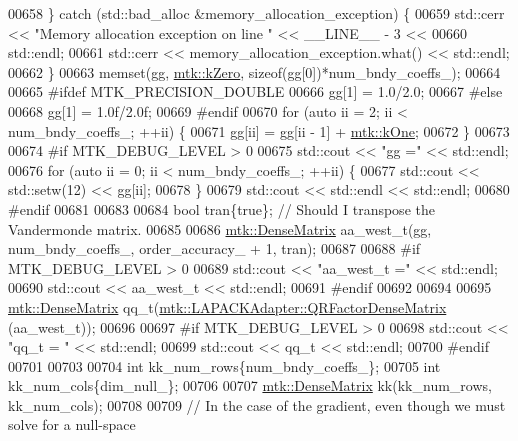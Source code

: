 \begin{DoxyCode}
{{00658   \} \textcolor{keywordflow}{catch} (std::bad\_alloc &memory\_allocation\_exception) \{
00659     std::cerr << \textcolor{stringliteral}{"Memory allocation exception on line "} << \_\_LINE\_\_ - 3 <<
00660       std::endl;
00661     std::cerr << memory\_allocation\_exception.what() << std::endl;
00662   \}
00663   memset(gg, \hyperlink{group__c01-roots_ga59a451a5fae30d59649bcda274fea271}{mtk::kZero}, \textcolor{keyword}{sizeof}(gg[0])*num\_bndy\_coeffs\_);
00664 
00665 \textcolor{preprocessor}{  #ifdef MTK\_PRECISION\_DOUBLE}
00666   gg[1] = 1.0/2.0;
00667 \textcolor{preprocessor}{  #else}
00668   gg[1] = 1.0f/2.0f;
00669 \textcolor{preprocessor}{  #endif}
00670   \textcolor{keywordflow}{for} (\textcolor{keyword}{auto} ii = 2; ii < num\_bndy\_coeffs\_; ++ii) \{
00671     gg[ii] = gg[ii - 1] + \hyperlink{group__c01-roots_ga26407c24d43b6b95480943340d285c71}{mtk::kOne};
00672   \}
00673 
00674 \textcolor{preprocessor}{  #if MTK\_DEBUG\_LEVEL > 0}
00675   std::cout << \textcolor{stringliteral}{"gg ="} << std::endl;
00676   \textcolor{keywordflow}{for} (\textcolor{keyword}{auto} ii = 0; ii < num\_bndy\_coeffs\_; ++ii) \{
00677     std::cout << std::setw(12) << gg[ii];
00678   \}
00679   std::cout << std::endl << std::endl;
00680 \textcolor{preprocessor}{  #endif}
00681 
00683 
00684   \textcolor{keywordtype}{bool} tran\{\textcolor{keyword}{true}\}; \textcolor{comment}{// Should I transpose the Vandermonde matrix.}
00685 
00686   \hyperlink{classmtk_1_1DenseMatrix}{mtk::DenseMatrix} aa\_west\_t(gg, num\_bndy\_coeffs\_, order\_accuracy\_ + 1, tran);
00687 
00688 \textcolor{preprocessor}{  #if MTK\_DEBUG\_LEVEL > 0}
00689   std::cout << \textcolor{stringliteral}{"aa\_west\_t ="} << std::endl;
00690   std::cout << aa\_west\_t << std::endl;
00691 \textcolor{preprocessor}{  #endif}
00692 
00694 
00695   \hyperlink{classmtk_1_1DenseMatrix}{mtk::DenseMatrix} qq\_t(\hyperlink{classmtk_1_1LAPACKAdapter_ae5c6e78c9c819c9ac7a6f31bfd011d7a}{mtk::LAPACKAdapter::QRFactorDenseMatrix}
      (aa\_west\_t));
00696 
00697 \textcolor{preprocessor}{  #if MTK\_DEBUG\_LEVEL > 0}
00698   std::cout << \textcolor{stringliteral}{"qq\_t = "} << std::endl;
00699   std::cout << qq\_t << std::endl;
00700 \textcolor{preprocessor}{  #endif}
00701 
00703 
00704   \textcolor{keywordtype}{int} kk\_num\_rows\{num\_bndy\_coeffs\_\};
00705   \textcolor{keywordtype}{int} kk\_num\_cols\{dim\_null\_\};
00706 
00707   \hyperlink{classmtk_1_1DenseMatrix}{mtk::DenseMatrix} kk(kk\_num\_rows, kk\_num\_cols);
00708 
00709   \textcolor{comment}{// In the case of the gradient, even though we must solve for a null-space}
}}
\end{DoxyCode}
